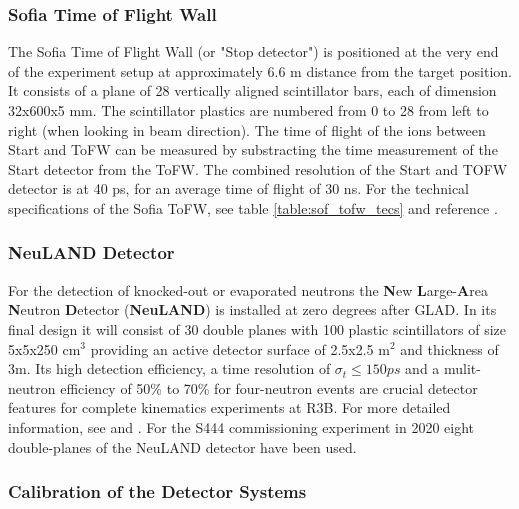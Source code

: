 \subsubsection{Sofia Time of Flight Wall}
The Sofia Time of Flight Wall (or "Stop detector") is positioned at the very end of the experiment setup at approximately 6.6 m distance from the target position. It consists of a plane of 28 vertically aligned scintillator bars, each of dimension 32x600x5 mm. The scintillator plastics are numbered from 0 to 28 from left to right (when looking in beam direction). The time of flight of the ions between Start and ToFW can be measured by substracting the time measurement of  the Start detector from the ToFW. The combined resolution of the Start and TOFW detector is at 40 ps, for an average time of flight of 30 ns\cite{martin2021fission}. For the technical specifications of the Sofia ToFW, see table \ref{table:sof_tofw_tecs} and reference \cite{bail2011time}.
\begin{figure}
\begin{floatrow}
\end{floatrow}
\end{figure}

\subsubsection{NeuLAND Detector}
For the detection of knocked-out or evaporated neutrons the \textbf{N}ew \textbf{L}arge-\textbf{A}rea \textbf{N}eutron \textbf{D}etector (\textbf{NeuLAND}) is installed at zero degrees after GLAD. In its final design it will consist of 30 double planes with 100 plastic scintillators of size 5x5x250 cm$^3$ providing an active detector surface of 2.5x2.5 m$^2$ and thickness of 3m. Its high detection efficiency, a time resolution of $\sigma_t \le 150 ps$ and a mulit-neutron efficiency of 50\% to 70\% for four-neutron events are crucial detector features for complete kinematics experiments at R3B. For more detailed information, see \cite{boretzky2021neuland} and \cite{boretzky2014neuland}.\newline
For the S444 commissioning experiment in 2020 eight double-planes of the NeuLAND detector have been used. 

\subsubsection{Calibration of the Detector Systems}




